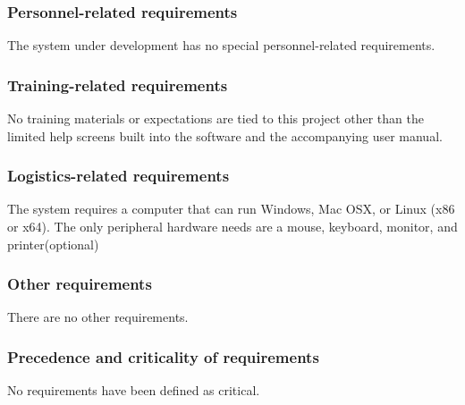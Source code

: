 \documentclass[twoside,letterpaper]{article}
\begin{document}
{\subsubsection[Personnel-related
requirements]
{\rmfamily\bfseries\color{black}
Personnel-related requirements}


{\color{black}
The system under development has no special personnel-related
requirements. }

\subsubsection[Training-related
requirements]{\rmfamily\bfseries\color{black}
Training-related requirements}

{\color{black}
No training materials or expectations are tied to this project other
than the limited help screens built into the software and the
accompanying user manual.}

\subsubsection[Logistics-related
requirements]{\rmfamily\bfseries\color{black}
Logistics-related requirements}

{\color{black}
The system requires a computer that can run Windows, Mac OSX, or Linux (x86 or x64).  The only peripheral hardware needs are a mouse, keyboard, monitor, and printer(optional)}

\subsubsection[Other
requirements]{\rmfamily\bfseries\color{black}
Other requirements}


{\color{black}
There are no other requirements.}

\subsubsection[Precedence and criticality of
requirements]{\rmfamily\bfseries\color{black}
Precedence and criticality of requirements}

{\color{black}
No requirements have been defined as critical.}

}
\end{document}
